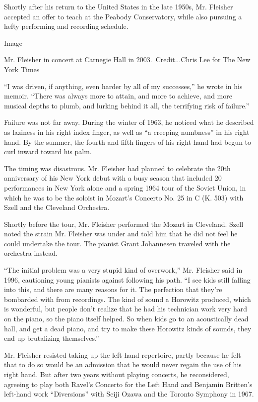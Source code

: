 Shortly after his return to the United States in the late 1950s, Mr.
Fleisher accepted an offer to teach at the Peabody Conservatory, while
also pursuing a hefty performing and recording schedule.

Image

Mr. Fleisher in concert at Carnegie Hall in 2003.~Credit...Chris Lee for
The New York Times

``I was driven, if anything, even harder by all of my successes,'' he
wrote in his memoir. ``There was always more to attain, and more to
achieve, and more musical depths to plumb, and lurking behind it all,
the terrifying risk of failure.''

Failure was not far away. During the winter of 1963, he noticed what he
described as laziness in his right index finger, as well as ``a creeping
numbness'' in his right hand. By the summer, the fourth and fifth
fingers of his right hand had begun to curl inward toward his palm.

The timing was disastrous. Mr. Fleisher had planned to celebrate the
20th anniversary of his New York debut with a busy season that included
20 performances in New York alone and a spring 1964 tour of the Soviet
Union, in which he was to be the soloist in Mozart's Concerto No. 25 in
C (K. 503) with Szell and the Cleveland Orchestra.

Shortly before the tour, Mr. Fleisher performed the Mozart in Cleveland.
Szell noted the strain Mr. Fleisher was under and told him that he did
not feel he could undertake the tour. The pianist Grant Johannesen
traveled with the orchestra instead.

``The initial problem was a very stupid kind of overwork,'' Mr. Fleisher
said in 1996, cautioning young pianists against following his path. ``I
see kids still falling into this, and there are many reasons for it. The
perfection that they're bombarded with from recordings. The kind of
sound a Horowitz produced, which is wonderful, but people don't realize
that he had his technician work very hard on the piano, so the piano
itself helped. So when kids go to an acoustically dead hall, and get a
dead piano, and try to make these Horowitz kinds of sounds, they end up
brutalizing themselves.''

Mr. Fleisher resisted taking up the left-hand repertoire, partly because
he felt that to do so would be an admission that he would never regain
the use of his right hand. But after two years without playing concerts,
he reconsidered, agreeing to play both Ravel's Concerto for the Left
Hand and Benjamin Britten's left-hand work ``Diversions'' with Seiji
Ozawa and the Toronto Symphony in 1967.


